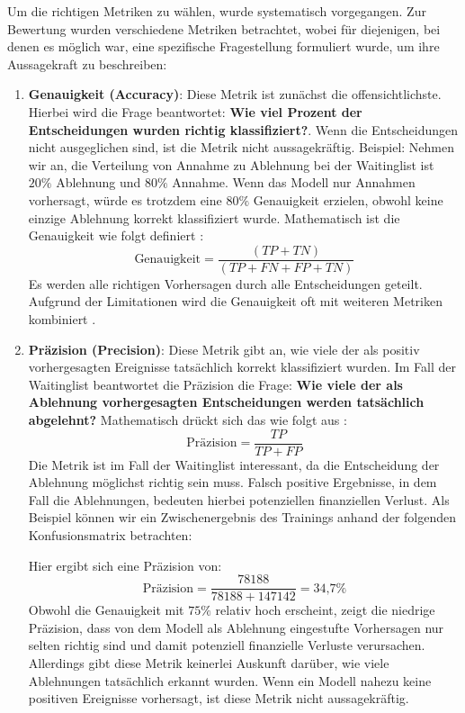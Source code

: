 Um die richtigen Metriken zu wählen, wurde systematisch vorgegangen.
Zur Bewertung wurden verschiedene Metriken betrachtet, wobei für diejenigen, bei denen es möglich war, eine spezifische Fragestellung formuliert wurde, um ihre Aussagekraft zu beschreiben:

\begin{enumerate}
    \item \textbf{Genauigkeit (Accuracy)}: Diese Metrik ist zunächst die offensichtlichste. Hierbei wird die Frage beantwortet: \textbf{Wie viel Prozent der Entscheidungen wurden richtig klassifiziert?}. Wenn die Entscheidungen nicht ausgeglichen sind, ist die Metrik nicht aussagekräftig. Beispiel: Nehmen wir an, die Verteilung von Annahme zu Ablehnung bei der Waitinglist ist $20\%$ Ablehnung und $80\%$ Annahme. Wenn das Modell nur Annahmen vorhersagt, würde es trotzdem eine $80\%$ Genauigkeit erzielen, obwohl keine einzige Ablehnung korrekt klassifiziert wurde. Mathematisch ist die Genauigkeit wie folgt definiert \cite{Swaminathan2024}: \[\text{Genauigkeit} = \frac{(TP + TN)}{(TP + FN + FP + TN)}\]
    Es werden alle richtigen Vorhersagen durch alle Entscheidungen geteilt. Aufgrund der Limitationen wird die Genauigkeit oft mit weiteren Metriken kombiniert \cite{Goodfellow2016}.
    
    \item \textbf{Präzision (Precision)}: Diese Metrik gibt an, wie viele der als positiv vorhergesagten Ereignisse tatsächlich korrekt klassifiziert wurden. Im Fall der Waitinglist beantwortet die Präzision die Frage: \textbf{Wie viele der als Ablehnung vorhergesagten Entscheidungen werden tatsächlich abgelehnt?} 
    Mathematisch drückt sich das wie folgt aus \cite{Swaminathan2024}:  \[\text{Präzision} = \frac{TP}{TP + FP}\]
    Die Metrik ist im Fall der Waitinglist interessant, da die Entscheidung der Ablehnung möglichst richtig sein muss. 
    Falsch positive Ergebnisse, in dem Fall die Ablehnungen, bedeuten hierbei potenziellen finanziellen Verlust. 
    Als Beispiel können wir ein Zwischenergebnis des Trainings anhand der folgenden Konfusionsmatrix betrachten:
    \begin{table}[H]
        \centering
        \caption{Beispiel: Konfusionsmatrix mit niedriger Präzision}
        \label{tab:confusion_matrix_1}
    \end{table}
    Hier ergibt sich eine Präzision von: \[ \text{Präzision} = \frac{78188}{78188 + 147142} = 34\text{,}7\% \]
    Obwohl die Genauigkeit mit $75\%$ relativ hoch erscheint, zeigt die niedrige Präzision, dass von dem Modell als Ablehnung eingestufte Vorhersagen nur selten richtig sind und damit potenziell finanzielle Verluste verursachen. 
    Allerdings gibt diese Metrik keinerlei Auskunft darüber, wie viele Ablehnungen tatsächlich erkannt wurden. 
    Wenn ein Modell nahezu keine positiven Ereignisse vorhersagt, ist diese Metrik nicht aussagekräftig. 
    

\end{enumerate}
